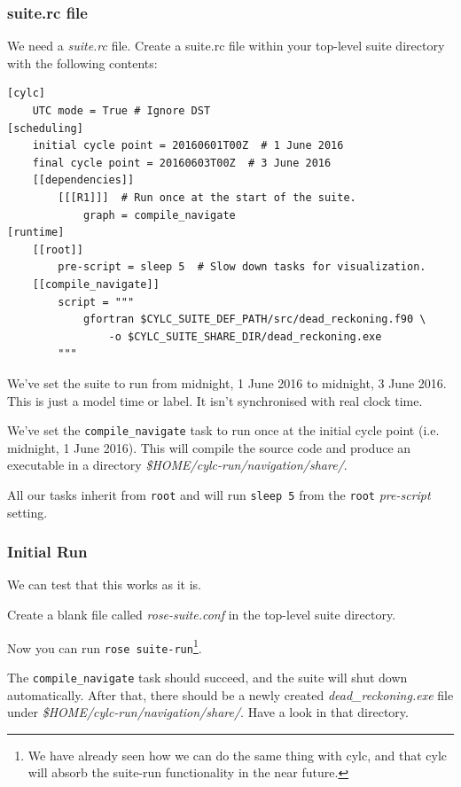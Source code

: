 \subsubsection{suite.rc file}

We need a {\em suite.rc} file. Create a suite.rc file within your top-level suite directory with the following contents:

\lstset{language=suiterc}
\begin{lstlisting}[columns=fullflexible]
[cylc]
    UTC mode = True # Ignore DST
[scheduling]
    initial cycle point = 20160601T00Z  # 1 June 2016
    final cycle point = 20160603T00Z  # 3 June 2016
    [[dependencies]]
        [[[R1]]]  # Run once at the start of the suite.
            graph = compile_navigate
[runtime]
    [[root]]
        pre-script = sleep 5  # Slow down tasks for visualization.
    [[compile_navigate]]
        script = """
            gfortran $CYLC_SUITE_DEF_PATH/src/dead_reckoning.f90 \
                -o $CYLC_SUITE_SHARE_DIR/dead_reckoning.exe
        """
\end{lstlisting}

    We've set the suite to run from midnight, 1 June 2016 to midnight, 3 June 2016. This is just a model time or label. It isn't synchronised with real clock time.

    We've set the \lstinline{compile_navigate} task to run once at the initial cycle point (i.e. midnight, 1 June 2016). This will compile the source code and produce an executable in a directory {\em \$HOME/cylc-run/navigation/share/}.

    All our tasks inherit from \lstinline{root} and will run \lstinline{sleep 5} from the \lstinline{root} {\em pre-script} setting.

\subsubsection{Initial Run}

    We can test that this works as it is.
    
    Create a blank file called {\em rose-suite.conf} in the top-level suite directory.

    Now you can run \lstinline{rose suite-run}\footnote {We have already seen how we can do the same thing with cylc, and that cylc will absorb the suite-run functionality in the near future.}.
    
    The \lstinline{compile_navigate} task should succeed, and the suite will shut down automatically. After that, there should be a newly created {\em dead\_reckoning.exe} file under {\em \$HOME/cylc-run/navigation/share/}. Have a look in that directory.

